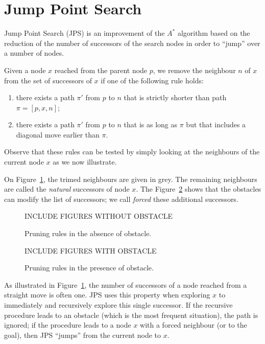 \section{Jump Point Search}
\label{sec::jps}

Jump Point Search (JPS) is an improvement of the $A^*$ algorithm 
based on the reduction of the number of successors of the search nodes 
in order to ``jump'' over a number of nodes.  

Given a node $x$ reached from the parent node $p$, 
we remove the neighbour $n$ of $x$ 
from the set of successors of $x$ 
if one of the following rule holds: 
\begin{enumerate}
\item 
  there exists a path $\pi'$ from $p$ to $n$ 
  that is strictly shorter than path $\pi = [p,x,n]$; 
\item 
  there exists a path $\pi'$ from $p$ to $n$ 
  that is as long as $\pi$ but that includes a diagonal move earlier than $\pi$.  
\end{enumerate}
Observe that these rules can be tested by simply looking 
at the neighbours of the current node $x$ 
as we now illustrate.  

On Figure~\ref{fig::pruning}, 
the trimed neighbours are given in grey.  
The remaining neighbours are called the \emph{natural} successors of node $x$.  
The Figure~\ref{fig::forced} shows 
that the obstacles can modify the list of successors; 
we call \emph{forced} these additional successors.  

\begin{figure}[ht]
  INCLUDE FIGURES WITHOUT OBSTACLE
  \caption{Pruning rules in the absence of obstacle.}
  \label{fig::pruning}
\end{figure}

\begin{figure}[ht]
  INCLUDE FIGURES WITH OBSTACLE
  \caption{Pruning rules in the presence of obstacle.}
  \label{fig::forced}
\end{figure}

As illustrated in Figure~\ref{fig::pruning}, 
the number of successors of a node reached from a straight move 
is often one.  
JPS uses this property when exploring $x$ 
to immediately and recursively explore this single successor.  
If the recursive procedure leads to an obstacle (which is the most frequent situation), 
the path is ignored; 
if the procedure leads to a node $x$ with a forced neighbour 
(or to the goal), then JPS ``jumps'' from the current node to $x$.  

